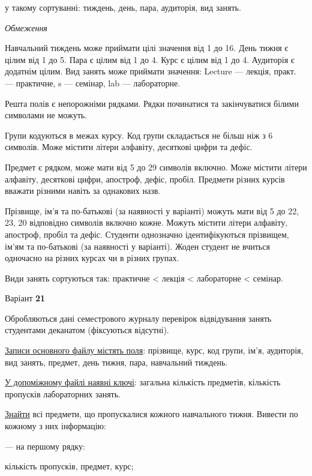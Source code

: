\documentclass[11pt, ukrainian]{article}
\begin{document}
{\noindent}у такому сортуванні: тиждень, день, пара, аудиторія, вид занять.


\bigskip\textit{Обмеження}

Навчальний тиждень може приймати цілі значення від 1 до 16.
День тижня є цілим від 1 до 5. Пара є цілим від 1 до 4.
Курс є цілим від 1 до 4. Аудиторія є додатнім цілим.
Вид занять може приймати значення:
Lecture --- лекція, практ. --- практичне, s --- семінар, lab --- лабораторне.

Решта полів є непорожніми рядками.
Рядки починатися та закінчуватися білими символами не можуть.

Групи кодуються в межах курсу.
Код групи складається не більш ніж з 6 символів.
Може містити літери алфавіту, десяткові цифри та дефіс.

Предмет є рядком, може мати від 5 до 29 символів включно.
Може містити літери алфавіту, десяткові цифри, апостроф, дефіс, пробіл.
Предмети різних курсів вважати різними навіть за однакових назв.

Прізвище, ім’я та по-батькові (за наявності у варіанті)
можуть мати від 5 до 22, 23, 20 відповідно символів включно кожне.
Можуть містити літери алфавіту, апостроф, пробіл та дефіс.
Студенти однозначно ідентифікуються прізвищем, ім’ям та по-батькові (за наявності у варіанті).
Жоден студент не вчиться одночасно на різних курсах чи в різних групах.

Види занять сортуються так: практичне < лекція < лабораторне < семінар.



\par
\newpage
{\center Варіант  \No \textbf { 21 }\par}
\bigskip
Обробляються дані семестрового журналу перевірок відвідування занять студентами деканатом (фіксуються відсутні). 

\underline{Записи основного файлу містять поля}: прізвище, курс, код групи, ім’я, аудиторія, вид занять, предмет, день тижня, пара, навчальний тиждень.

\underline{У допоміжному файлі наявні ключі}: загальна кількість предметів, кількість пропусків лабораторних занять.

\underline{Знайти} всі предмети, що пропускалися кожного навчального тижня. Вивести по кожному з них інформацію:\par
{\noindent}--- на першому рядку:\par
кількість пропусків, предмет, курс;
\end{document}
